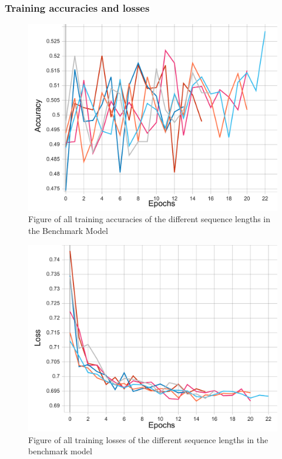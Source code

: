\subsubsection{Training accuracies and losses}
\begin{figure}[ht]
    \centering
    \includegraphics[width=0.95\columnwidth]{figures/results/benchmark/benchmark_all_acc_t.pdf}
    \caption[Training accuracies for Benchmark Model]{Figure of all training accuracies of the different sequence lengths in the Benchmark Model}
    \label{fig:benchmark_train_accuracy}
\end{figure}
\FloatBarrier

\begin{figure}[ht]
    \centering
    \includegraphics[width=0.95\columnwidth]{figures/results/benchmark/benchmark_all_loss_t.pdf}
    \caption[Training losses for benchmark model]{Figure of all training losses of the different sequence lengths in the benchmark model}
    \label{fig:benchmark_train_loss}
\end{figure}
\FloatBarrier

